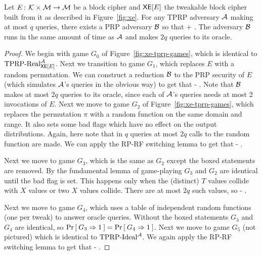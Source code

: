 \begin{theorem}
  Let $E{{\kern .05em}\colon{\kern .05em}}{\cal K}\times{\cal M}\rightarrow{\cal M}$ be a block cipher and $\mathsf{XE}[E]$ the tweakable block cipher built from it as described in Figure~\ref{fig:xe}. For any TPRP adversary ${\mathcal A}$ making at most $q$ queries, there exists a PRP adversary ${\mathcal B}$ so that
  \bnm
  \AdvTPRP{\xe[E]}{\advA} \leq {} + \; .
  \enm
  The adversary ${\mathcal B}$ runs in the same amount of time as ${\mathcal A}$ and makes $2q$ queries to its oracle.
\end{theorem}
\begin{proof}
  We begin with game $G_0$ of Figure~\ref{fig:xe-tprp-games}, which is identical to $\text{TPRP-Real}^{\mathcal A}_{\mathsf{XE}[E]}$. Next we transition to game $G_1$, which replaces $E$ with a random permutation. We can construct a reduction ${\mathcal B}$ to the PRP security of $E$ (which simulates ${\mathcal A}$'s queries in the obvious way) to get that
  \bnm
  \left\lvert{} - \right\rvert \leq {}\; .
  \enm
  Note that ${\mathcal B}$ makes at most $2q$ queries to its oracle, since each of ${\mathcal A}$'s queries needs at most 2 invocations of $E$. Next we move to game $G_2$ of Figure~\ref{fig:xe-tprp-games}, which replaces the permutation $\pi$ with a random function on the same domain and range. It also sets some bad flags which have no effect on the output distributions. Again, here note that in $q$ queries at most $2q$ calls to the random function are made. We can apply the RP-RF switching lemma to get that
  \bnm
  \left\lvert{} - \right\rvert \leq {}\; .
  \enm

  Next we move to game $G_3$, which is the same as $G_2$ except the boxed statements are removed. By the fundamental lemma of game-playing $G_3$ and $G_2$ are identical until the bad flag is set.
  This happens only when the (distinct) $T$ values collide with $X$ values or two $X$ values collide. There are at most $2q$ such values, so
  \bnm
  \left\lvert{} - \right\rvert \leq {}\; .
  \enm

  Next we move to game $G_4$, which uses a table of independent random functions (one per tweak) to answer oracle queries. Without the boxed statements $G_3$ and $G_4$ are identical, so $\Pr\left[\: G_3\Rightarrow 1 \:\right] = \Pr\left[\: G_4\Rightarrow 1 \:\right]$. Next we move to game $G_5$ (not pictured) which is identical to $\text{TPRP-Ideal}^{\mathcal A}$. We again apply the RP-RF switching lemma to get that
  \bnm
  \left\lvert{} - \right\rvert \leq {}\; .
  \enm
\end{proof}

